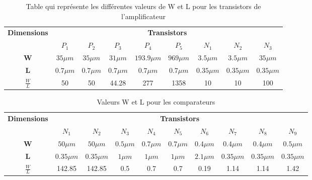 \documentclass[11pt]{article}
\begin{document}
\begin{table}[!htb]
\centering

\label{tab:table2}
\begin{tabular}{|c|c|c|c|c|c|c|c|c|}
\hline
\multicolumn{1}{|l|}{\multirow{2}{*}{\textbf{Dimensions}}} & \multicolumn{8}{c|}{\textbf{Transistors}}                                                                                             \\ \cline{2-9} 
\multicolumn{1}{|l|}{}                                     & \textbf{$P_1$} & \textbf{$P_2$} & \textbf{$P_3$} & \textbf{$P_4$} & \textbf{$P_5$} & \textbf{$N_1$} & \textbf{$N_2$} & \textbf{$N_3$} \\ \hline
\textbf{W}                                                 & $35 \mu m$     & $35 \mu m$     & $31 \mu m$     & $193.9 \mu m$  & $969 \mu m$    & $3.5 \mu m$    & $3.5 \mu m$    & $35 \mu m$     \\ \hline
\textbf{L}                                                 & $0.7 \mu m$    & $0.7 \mu m$    & $0.7 \mu m$    & $0.7 \mu m$    & $0.7 \mu m$    & $0.35 \mu m$   & $0.35 \mu m$   & $0.35 \mu m$   \\ \hline
\textbf{$\frac{W}{L}$}                                     & 50             & 50             & 44.28          & 277            & 1358           & 10             & 10             & 100            \\ \hline
\end{tabular}
\caption{Table qui repr\'esente les diff\'erentes valeurs de W et L pour les transistors de l'amplificateur}
\end{table}

\begin{table}[!htb]
\centering
\label{tab:table3}
\begin{tabular}{|c|c|c|c|c|c|c|c|c|c|}
\hline
\multirow{2}{*}{\textbf{Dimensions}} & \multicolumn{9}{c|}{\textbf{Transistors}}                                                                                                              \\ \cline{2-10} 
                                     & \textbf{$N_1$} & \textbf{$N_2$} & \textbf{$N_3$} & \textbf{$N_4$} & \textbf{$N_5$} & \textbf{$N_6$} & \textbf{$N_7$} & \textbf{$N_8$} & \textbf{$N_9$} \\ \hline
\textbf{W}                           & $ 50 \mu m$    & $50 \mu m$     & $0.5 \mu m$    & $0.7 \mu m$    & $0.7 \mu m$    & $0.4 \mu m$    & $0.4 \mu m$    & $0.4 \mu m$    & $0.5 \mu m$    \\ \hline
\textbf{L}                           & $ 0.35 \mu m$  & $0.35 \mu m$   & $1 \mu m$      & $1 \mu m$      & $1 \mu m$      & $2.1 \mu m$    & $0.35 \mu m$   & $0.35 \mu m$   & $0.35 \mu m$   \\ \hline
\textbf{$\frac{W}{L}$}               & 142.85         & 142.85         & 0.5            & 0.7            & 0.7            & 0.19           & 1.14           & 1.14           & 1.42           \\ \hline
\end{tabular}
\caption{Valeurs W et L pour les comparateurs}
\end{table}
\end{document}
